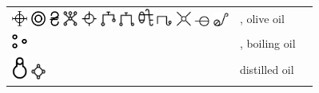 \documentclass[british,final,landscape]{scrartcl}
\begin{document}
\begin{refsection}
\begin{supertabular}{p{0.3\textwidth}p{0.34\textwidth}p{0.34\textwidth}}
   \includegraphics[width=5mm]{Plant/Oil2} \includegraphics[width=5mm]{Plant/Oil3} \includegraphics[height=5mm]{Plant/Oil5} \includegraphics[width=5mm]{Plant/Oil7} \includegraphics[width=5mm]{Plant/Oil8} \includegraphics[width=5mm]{Plant/Oil18} \includegraphics[width=5mm]{Plant/Oil19} \includegraphics[width=5mm]{Plant/Oil20} \includegraphics[width=5mm]{Plant/Oil21} \includegraphics[width=5mm]{Plant/Oil22} \includegraphics[width=5mm]{Plant/Oil23} \includegraphics[width=5mm]{Plant/Oil24} & , olive oil & \\
   \includegraphics[width=5mm]{Plant/BoilingOil} & , boiling oil & \\
   \includegraphics[width=5mm]{Plant/DistilledOil} \includegraphics[width=5mm]{Plant/DistilledOil2} & distilled oil & \\

\end{supertabular}
\end{refsection}
\end{document}
